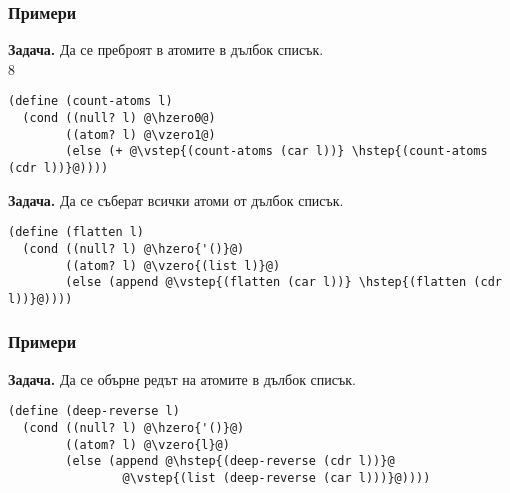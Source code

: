 \documentclass[alsotrans]{beamerswitch}
\newcommand{\hzero}{\textcolor{red}}
\newcommand{\vzero}{\textcolor{orange}}
\newcommand{\hstep}{\textcolor{green}}
\newcommand{\vstep}{\textcolor{cyan}}
\begin{document}
\begin{frame}[fragile]
  \frametitle{Примери}
  \small
  \textbf{Задача.} Да се преброят в атомите в дълбок списък.\\
  8
  \pause
\begin{lstlisting}
(define (count-atoms l)
  (cond ((null? l) @\hzero0@)
        ((atom? l) @\vzero1@)
        (else (+ @\vstep{(count-atoms (car l))} \hstep{(count-atoms (cdr l))}@))))
\end{lstlisting}
\vspace{2ex}
  \pause
  \textbf{Задача.} Да се съберат всички атоми от дълбок списък.\\
  \pause
\begin{lstlisting}
(define (flatten l)
  (cond ((null? l) @\hzero{'()}@)
        ((atom? l) @\vzero{(list l)}@)
        (else (append @\vstep{(flatten (car l))} \hstep{(flatten (cdr l))}@))))
\end{lstlisting}
\end{frame}

\begin{frame}[fragile]
  \frametitle{Примери}

  \textbf{Задача.} Да се обърне редът на атомите в дълбок списък.\\
  \pause
\begin{lstlisting}
(define (deep-reverse l)
  (cond ((null? l) @\hzero{'()}@)
        ((atom? l) @\vzero{l}@)
        (else (append @\hstep{(deep-reverse (cdr l))}@
                @\vstep{(list (deep-reverse (car l)))}@))))
\end{lstlisting}
\end{frame}
\end{document}

